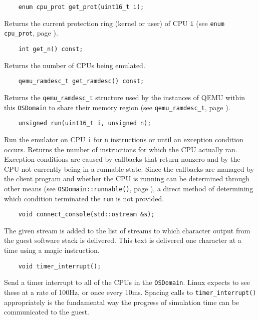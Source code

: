 \documentclass[letterpaper, 10pt]{book}
\begin{document}
\label{func:get_proc} \begin{verbatim}
    enum cpu_prot get_prot(uint16_t i);
\end{verbatim}
Returns the current protection ring (kernel or user) of CPU \texttt{i} (see
\texttt{enum cpu\_prot}, page \pageref{enum:cpu_prot}).

\label{func:get_n} \begin{verbatim}
    int get_n() const;
\end{verbatim}
Returns the number of CPUs being emulated.

\label{func:get_ramdesc} \begin{verbatim}
    qemu_ramdesc_t get_ramdesc() const;
\end{verbatim}
Returns the \texttt{qemu\_ramdesc\_t} structure used by the instances of QEMU
within this \texttt{OSDomain} to share their memory region (see 
\texttt{qemu\_ramdesc\_t}, page \pageref{struct:qemu_ramdesc_t}).

\label{func:run} \begin{verbatim}
    unsigned run(uint16_t i, unsigned n);
\end{verbatim}
Run the emulator on CPU \texttt{i} for \texttt{n} instructions or until an
exception condition occurs. Returns the number of instructions for which the
CPU actually ran. Exception conditions are caused by callbacks that return
nonzero and by the CPU not currently being in a runnable state. Since the
callbacks are managed by the client program and whether the CPU is running
can be determined through other means (see \texttt{OSDomain::runnable()}, page 
\pageref{func:runnable}), a direct method of determining which condition
terminated the \texttt{run} is not provided.

\label{func:connect_console} \begin{verbatim}
    void connect_console(std::ostream &s);
\end{verbatim}
The given stream is added to the list of streams to which character output from
the guest software stack is delivered. This text is delivered one character at
a time using a magic instruction.

\label{func:timer_interrupt} \begin{verbatim}
    void timer_interrupt();
\end{verbatim}
Send a timer interrupt to all of the CPUs in the \texttt{OSDomain}. Linux
expects to see these at a rate of 100Hz, or once every 10ms. Spacing calls to
\texttt{timer\_interrupt()} appropriately is the fundamental way the progress
of simulation time can be communicated to the guest.
\end{document}
